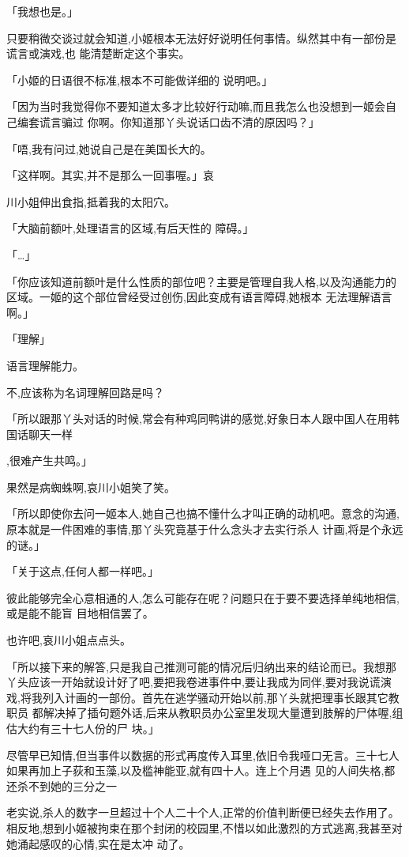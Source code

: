 \documentclass{article}
\begin{document}
「我想也是。」 

只要稍微交谈过就会知道,小姬根本无法好好说明任何事情。纵然其中有一部份是谎言或演戏,也
能清楚断定这个事实。 

「小姬的日语很不标准,根本不可能做详细的
说明吧。」 

「因为当时我觉得你不要知道太多才比较好行动嘛,而且我怎么也没想到一姬会自己编套谎言骗过
你啊。你知道那丫头说话口齿不清的原因吗？」 

「唔,我有问过,她说自己是在美国长大的。

「这样啊。其实,并不是那么一回事喔。」哀
\newpage

川小姐伸出食指,抵着我的太阳穴。 

「大脑前额叶,处理语言的区域,有后天性的
障碍。」 


「…」 

「你应该知道前额叶是什么性质的部位吧？主要是管理自我人格,以及沟通能力的区域。一姬的这个部位曾经受过创伤,因此变成有语言障碍,她根本
无法理解语言啊。」 


「理解」 


语言理解能力。 


不,应该称为名词理解回路是吗？ 

「所以跟那丫头对话的时候,常会有种鸡同鸭讲的感觉,好象日本人跟中国人在用韩国话聊天一样

\newpage
,很难产生共鸣。」 


果然是病蜘蛛啊,哀川小姐笑了笑。 

「所以即使你去问一姬本人,她自己也搞不懂什么才叫正确的动机吧。意念的沟通,原本就是一件困难的事情,那丫头究竟基于什么念头才去实行杀人
计画,将是个永远的谜。」 


「关于这点,任何人都一样吧。」 

彼此能够完全心意相通的人,怎么可能存在呢？问题只在于要不要选择单纯地相信,或是能不能盲
目地相信罢了。 


也许吧,哀川小姐点点头。 

「所以接下来的解答,只是我自己推测可能的情况后归纳出来的结论而已。我想那丫头应该一开始就设计好了吧,要把我卷进事件中,要让我成为同伴,要对我说谎演戏,将我列入计画的一部份。首先在逃学骚动开始以前,那丫头就把理事长跟其它教职员
\newpage
都解决掉了插句题外话,后来从教职员办公室里发现大量遭到肢解的尸体喔,组估大约有三十七人份的尸
块。」 


尽管早已知情,但当事件以数据的形式再度传入耳里,依旧令我哑口无言。三十七人如果再加上子荻和玉藻,以及槛神能亚,就有四十人。连上个月遇
见的人间失格,都还杀不到她的三分之一 

老实说,杀人的数字一旦超过十个人二十个人,正常的价值判断便已经失去作用了。相反地,想到小姬被拘束在那个封闭的校园里,不惜以如此激烈的方式逃离,我甚至对她涌起感叹的心情,实在是太冲
动了。 
\end{document}
